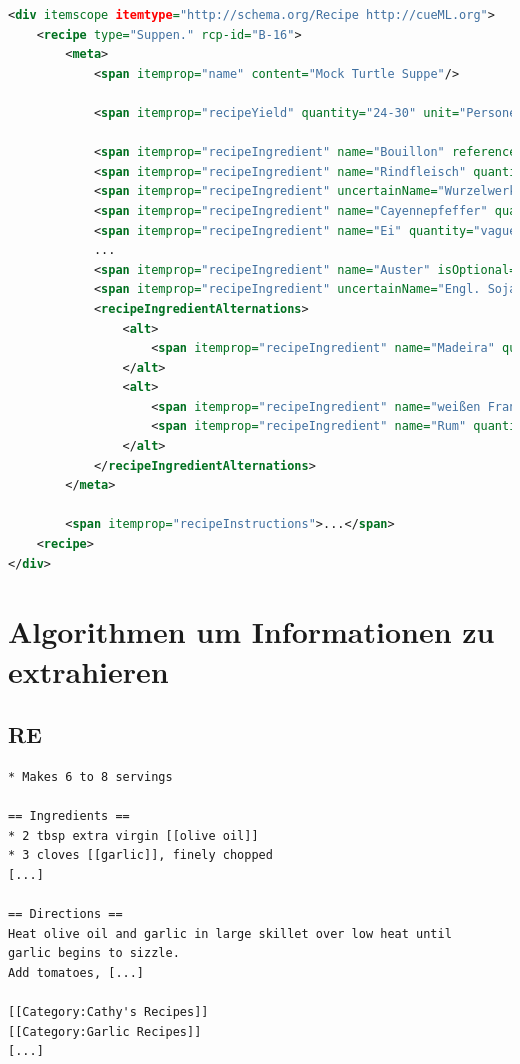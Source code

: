 \documentclass[12pt]{beamer}
\begin{document}
\begin{frame}[fragile]
\begin{lstlisting}[language=XML, caption={Rezept mit besserem cueML}]
<div itemscope itemtype="http://schema.org/Recipe http://cueML.org">
	<recipe type="Suppen." rcp-id="B-16">
		<meta>
			<span itemprop="name" content="Mock Turtle Suppe"/>
			
			<span itemprop="recipeYield" quantity="24-30" unit="Personen"/>
			
			<span itemprop="recipeIngredient" name="Bouillon" reference="#Bouillon"/>
			<span itemprop="recipeIngredient" name="Rindfleisch" quantity="8-10" unit="Pfund"/>
			<span itemprop="recipeIngredient" uncertainName="Wurzelwerk"/>
			<span itemprop="recipeIngredient" name="Cayennepfeffer" quantity="vague" unit="Messersptize"/>
			<span itemprop="recipeIngredient" name="Ei" quantity="vague"/>
			...
			<span itemprop="recipeIngredient" name="Auster" isOptional="True"/>
			<span itemprop="recipeIngredient" uncertainName="Engl. Soja" quantity="vague" unit="EL" isOptional="True"/>
			<recipeIngredientAlternations>
				<alt>
					<span itemprop="recipeIngredient" name="Madeira" quantity="0.5" unit="Flasche"/>
				</alt>
				<alt>
					<span itemprop="recipeIngredient" name="weißen Franzwein"/>
					<span itemprop="recipeIngredient" name="Rum" quantity="vague"/>
				</alt>
			</recipeIngredientAlternations>
		</meta>
		
		<span itemprop="recipeInstructions">...</span>
	<recipe>
</div>		
\end{lstlisting}
\end{frame}


\section{Algorithmen um Informationen zu extrahieren}
\subsection{RE}
\begin{frame}[fragile]
	\begin{lstlisting}[frame=single, basicstyle=\footnotesize\ttfamily, caption={Beispiel Rezept von \newline http://recipes.wikia.com/wiki/Recipes\_Wiki}]
* Makes 6 to 8 servings

== Ingredients ==
* 2 tbsp extra virgin [[olive oil]]
* 3 cloves [[garlic]], finely chopped
[...]

== Directions ==
Heat olive oil and garlic in large skillet over low heat until
garlic begins to sizzle.
Add tomatoes, [...]

[[Category:Cathy's Recipes]]
[[Category:Garlic Recipes]]
[...]
	\end{lstlisting}
\end{frame}
\end{document}
